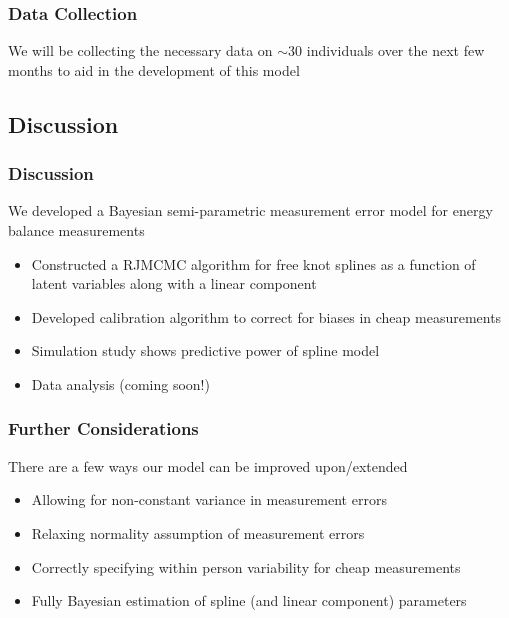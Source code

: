 \documentclass[handout]{beamer}\usepackage[]{graphicx}\usepackage[]{color}
\begin{document}
\begin{frame}
\frametitle{Data Collection}
We will be collecting the necessary data on $\sim$30 individuals over the next few months to aid in the development of this model

\end{frame}


\subsection{Discussion}

\begin{frame}
\frametitle{Discussion}
We developed a Bayesian semi-parametric measurement error model for energy balance measurements

\begin{itemize}
\item
Constructed a RJMCMC algorithm for free knot splines as a function of latent variables along with a linear component
\item
Developed calibration algorithm to correct for biases in cheap measurements
\item
Simulation study shows predictive power of spline model
\item
Data analysis (coming soon!)
\end{itemize}

\end{frame}

\begin{frame}
\frametitle{Further Considerations}
There are a few ways our model can be improved upon/extended

\begin{itemize}
\item
Allowing for non-constant variance in measurement errors
\item
Relaxing normality assumption of measurement errors
\item
Correctly specifying within person variability for cheap measurements
\item
Fully Bayesian estimation of spline (and linear component) parameters
\end{itemize}

\end{frame}
\end{document}
